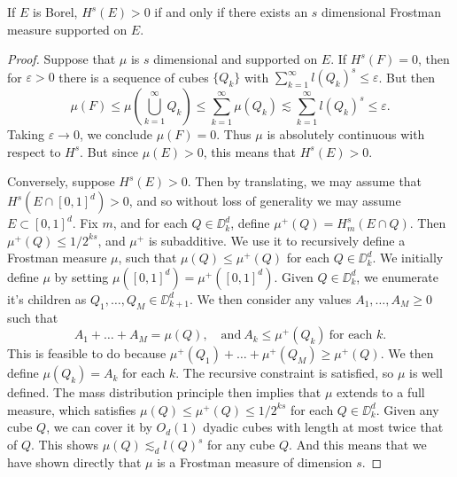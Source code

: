 
\begin{lemma}
	If $E$ is Borel, $H^s(E) > 0$ if and only if there exists an $s$ dimensional Frostman measure supported on $E$.
\end{lemma}
\begin{proof}
	Suppose that $\mu$ is $s$ dimensional and supported on $E$. If $H^s(F) = 0$, then for $\varepsilon > 0$ there is a sequence of cubes $\{ Q_k \}$ with $\sum_{k = 1}^\infty l(Q_k)^s \leq \varepsilon$. But then
	\[ \mu(F) \leq \mu \left( \bigcup_{k = 1}^\infty Q_k \right) \leq \sum_{k = 1}^\infty \mu(Q_k) \lesssim \sum_{k = 1}^\infty l(Q_k)^s \leq \varepsilon. \]
	Taking $\varepsilon \to 0$, we conclude $\mu(F) = 0$. Thus $\mu$ is absolutely continuous with respect to $H^s$. But since $\mu(E) > 0$, this means that $H^s(E) > 0$.

	Conversely, suppose $H^s(E) > 0$. Then by translating, we may assume that $H^s(E \cap [0,1]^d) > 0$, and so without loss of generality we may assume $E \subset [0,1]^d$. Fix $m$, and for each $Q \in \DD_k^d$, define $\mu^+(Q) = H^s_m(E \cap Q)$. Then $\mu^+(Q) \leq 1/2^{ks}$, and $\mu^+$ is subadditive. We use it to recursively define a Frostman measure $\mu$, such that $\mu(Q) \leq \mu^+(Q)$ for each $Q \in \DD_k^d$. We initially define $\mu$ by setting $\mu([0,1]^d) = \mu^+([0,1]^d)$. Given $Q \in \DD_k^d$, we enumerate it's children as $Q_1, \dots, Q_M \in \DD_{k+1}^d$. We then consider any values $A_1, \dots, A_M \geq 0$ such that
	\[ A_1 + \dots + A_M = \mu(Q),\quad \text{and}\ A_k \leq \mu^+(Q_k)\ \text{for each $k$}. \]
	This is feasible to do because $\mu^+(Q_1) + \dots + \mu^+(Q_M) \geq \mu^+(Q)$. We then define $\mu(Q_k) = A_k$ for each $k$. The recursive constraint is satisfied, so $\mu$ is well defined. The mass distribution principle then implies that $\mu$ extends to a full measure, which satisfies $\mu(Q) \leq \mu^+(Q) \leq 1/2^{ks}$ for each $Q \in \DD_k^d$. Given any cube $Q$, we can cover it by $O_d(1)$ dyadic cubes with length at most twice that of $Q$. This shows $\mu(Q) \lesssim_d l(Q)^s$ for any cube $Q$. And this means that we have shown directly that $\mu$ is a Frostman measure of dimension $s$.
\end{proof}

